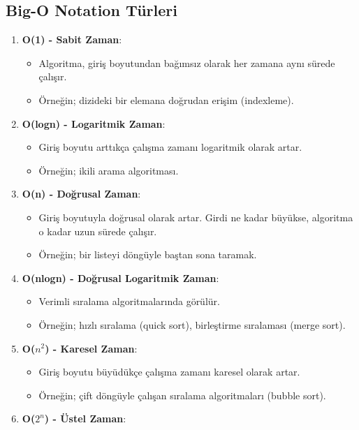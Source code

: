 \subsection{Big-O Notation Türleri}

\begin{enumerate}
    \item \textbf{O(1) - Sabit Zaman}:
    \begin{itemize}
        \item Algoritma, giriş boyutundan bağımsız olarak her zamana aynı sürede çalışır.
        \item Örneğin; dizideki bir elemana doğrudan erişim (indexleme).
    \end{itemize}
    \item \textbf{O(logn) - Logaritmik Zaman}:
    \begin{itemize}
        \item Giriş boyutu arttıkça çalışma zamanı logaritmik olarak artar.
        \item Örneğin; ikili arama algoritması.
    \end{itemize}
    \item \textbf{O(n) - Doğrusal Zaman}:
    \begin{itemize}
        \item Giriş boyutuyla doğrusal olarak artar. Girdi ne kadar büyükse, algoritma o kadar uzun sürede çalışır.
        \item Örneğin; bir listeyi döngüyle baştan sona taramak.
    \end{itemize}
    \item \textbf{O(nlogn) - Doğrusal Logaritmik Zaman}:
    \begin{itemize}
        \item Verimli sıralama algoritmalarında görülür.
        \item Örneğin; hızlı sıralama (quick sort), birleştirme sıralaması (merge sort).
    \end{itemize}
    \item \textbf{O($n^2$) - Karesel Zaman}:
    \begin{itemize}
        \item Giriş boyutu büyüdükçe çalışma zamanı karesel olarak artar.
        \item Örneğin; çift döngüyle çalışan sıralama algoritmaları (bubble sort).
    \end{itemize}
    \item \textbf{O($2^n$) - Üstel Zaman}:
    \begin{itemize}

\end{itemize}
\end{enumerate}
